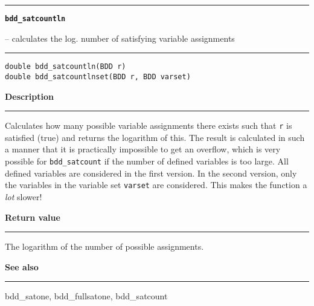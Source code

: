 \begin{minipage}{\textwidth}

\noindent\begin{minipage}{\textwidth}
\rule{\textwidth}{0.5mm}
{\tt\bf bdd\_satcountln }
\--- calculates the log. number of satisfying variable assignments  \hspace{\fill}
\\\rule[1.5ex]{\textwidth}{0.5mm}
\end{minipage}

\noindent\begin{verbatim}
double bdd_satcountln(BDD r)
double bdd_satcountlnset(BDD r, BDD varset)
\end{verbatim}

\vspace{\parsep}\noindent
{\bf Description}\\\rule[1.5ex]{\textwidth}{0.2mm}\vspace{-1.5ex}\setlength{\parindent}{1em}
Calculates how many possible variable assignments there
	   exists such that {\tt r} is satisfied (true) and returns
	   the logarithm of this. The result is calculated in such a
	   manner that it is practically impossible to get an
	   overflow, which is very possible for {\tt bdd\_satcount} if
	   the number of defined variables is too large. All defined
	   variables are considered in the first version. In the
	   second version, only the variables in the variable
	   set {\tt varset} are considered. This makes the function
	   a {\em lot} slower! 

\setlength{\parindent}{0em}\vspace{\parsep}\vspace{\baselineskip}\noindent
{\bf Return value}\\\rule[1.5ex]{\textwidth}{0.2mm}\vspace{-1.5ex}
The logarithm of the number of possible assignments. 

\vspace{\parsep}\vspace{\baselineskip}\noindent
{\bf See also}\\\rule[1.5ex]{\textwidth}{0.2mm}\vspace{-1.5ex}
bdd\_satone, bdd\_fullsatone, bdd\_satcount 
\end{minipage}
\vspace{8ex}
